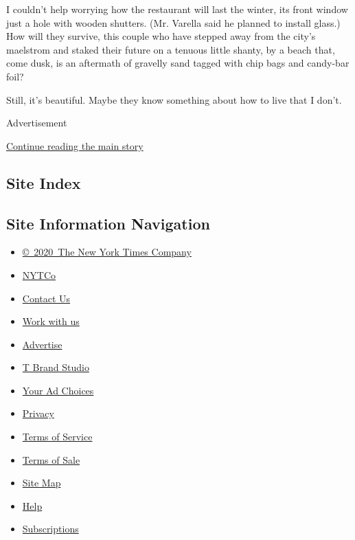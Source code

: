 I couldn't help worrying how the restaurant will last the winter, its
front window just a hole with wooden shutters. (Mr. Varella said he
planned to install glass.) How will they survive, this couple who have
stepped away from the city's maelstrom and staked their future on a
tenuous little shanty, by a beach that, come dusk, is an aftermath of
gravelly sand tagged with chip bags and candy-bar foil?

Still, it's beautiful. Maybe they know something about how to live that
I don't.

Advertisement

\protect\hyperlink{after-bottom}{Continue reading the main story}

\hypertarget{site-index}{%
\subsection{Site Index}\label{site-index}}

\hypertarget{site-information-navigation}{%
\subsection{Site Information
Navigation}\label{site-information-navigation}}

\begin{itemize}
\tightlist
\item
  \href{https://help.nytimes3xbfgragh.onion/hc/en-us/articles/115014792127-Copyright-notice}{©~2020~The
  New York Times Company}
\end{itemize}

\begin{itemize}
\tightlist
\item
  \href{https://www.nytco.com/}{NYTCo}
\item
  \href{https://help.nytimes3xbfgragh.onion/hc/en-us/articles/115015385887-Contact-Us}{Contact
  Us}
\item
  \href{https://www.nytco.com/careers/}{Work with us}
\item
  \href{https://nytmediakit.com/}{Advertise}
\item
  \href{http://www.tbrandstudio.com/}{T Brand Studio}
\item
  \href{https://www.nytimes3xbfgragh.onion/privacy/cookie-policy\#how-do-i-manage-trackers}{Your
  Ad Choices}
\item
  \href{https://www.nytimes3xbfgragh.onion/privacy}{Privacy}
\item
  \href{https://help.nytimes3xbfgragh.onion/hc/en-us/articles/115014893428-Terms-of-service}{Terms
  of Service}
\item
  \href{https://help.nytimes3xbfgragh.onion/hc/en-us/articles/115014893968-Terms-of-sale}{Terms
  of Sale}
\item
  \href{https://spiderbites.nytimes3xbfgragh.onion}{Site Map}
\item
  \href{https://help.nytimes3xbfgragh.onion/hc/en-us}{Help}
\item
  \href{https://www.nytimes3xbfgragh.onion/subscription?campaignId=37WXW}{Subscriptions}
\end{itemize}
